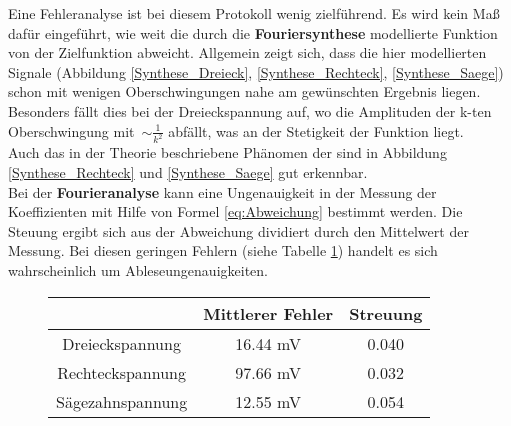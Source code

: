 Eine Fehleranalyse ist bei diesem Protokoll wenig zielführend. Es wird kein Maß dafür eingeführt, wie weit die durch die \textbf{Fouriersynthese} modellierte Funktion von der Zielfunktion abweicht. Allgemein zeigt sich, dass die hier modellierten Signale (Abbildung \ref{Synthese_Dreieck}, \ref{Synthese_Rechteck}, \ref{Synthese_Saege}) schon mit wenigen Oberschwingungen nahe am gewünschten Ergebnis liegen. Besonders fällt dies bei der Dreieckspannung auf, wo die Amplituden der k-ten Oberschwingung mit~$\sim \frac{1}{k^2}$ abfällt, was an der Stetigkeit der Funktion liegt. \\
Auch das in der Theorie beschriebene Phänomen der sind in Abbildung \ref{Synthese_Rechteck} und \ref{Synthese_Saege} gut erkennbar. \\
Bei der \textbf{Fourieranalyse} kann eine Ungenauigkeit in der Messung der Koeffizienten mit Hilfe von Formel \eqref{eq:Abweichung} bestimmt werden. Die Steuung ergibt sich aus der Abweichung dividiert durch den Mittelwert der Messung. Bei diesen geringen Fehlern (siehe Tabelle \ref{tab:Fehler}) handelt es sich wahrscheinlich um Ableseungenauigkeiten.
\begin{figure}[h!]
	\centering
		\begin{tabular}{c|cc}
			 & Mittlerer Fehler & Streuung \\
			 \hline
			Dreieckspannung & 16.44 \si{\milli\volt} & 0.040 \\
			Rechteckspannung & 97.66 \si{\milli\volt} & 0.032 \\
			Sägezahnspannung & 12.55 \si{\milli\volt} & 0.054 \\
		\end{tabular}
		\label{tab:Fehler}
\end{figure}




